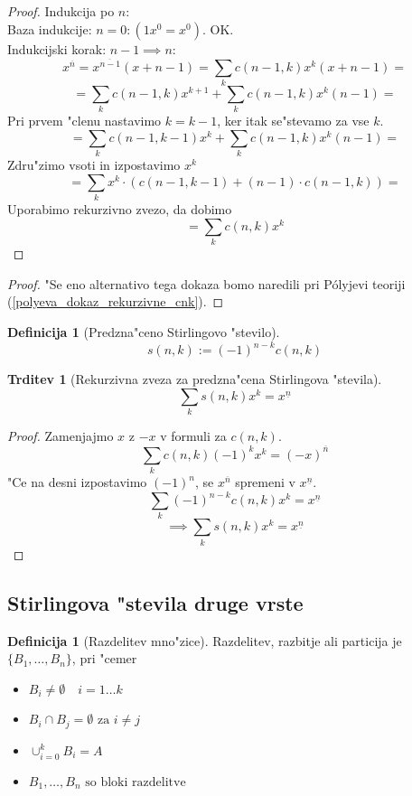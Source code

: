 \documentclass[a4paper,12pt]{article}
\theoremstyle{definition}
\newtheorem{defn}[counter]{Definicija}
\newtheorem{claim}[counter]{Trditev}
\theoremstyle{remark}
\begin{document}
\begin{proof}
    Indukcija po $n$:\\
    Baza indukcije: $n = 0: (1x^0 = x^0)$. OK.\\
    Indukcijski korak: $n - 1 \implies n$:\\
    \[x^{\overline{n}} = x^{\overline{n-1}}(x+n-1) = \sum_k c(n-1,k)x^k (x+n-1) =\]
    \[= \sum_k c(n-1,k)x^{k+1} + \sum_k c(n-1,k)x^k (n-1) = \]
    Pri prvem "clenu nastavimo $k = k-1$, ker itak se"stevamo za vse $k$.
    \[= \sum_k c(n-1,k-1)x^{k} + \sum_k c(n-1,k)x^k (n-1) = \]
    Zdru"zimo vsoti in izpostavimo $x^k$
    \[= \sum_k x^{k}\cdot (c(n-1,k-1) + (n-1)\cdot c(n-1,k)) = \]
    Uporabimo rekurzivno zvezo, da dobimo
    \[= \sum_k c(n,k)x^k\]
\end{proof}
\begin{proof}
	"Se eno alternativo tega dokaza bomo naredili pri P\'olyjevi teoriji (\ref{polyeva_dokaz_rekurzivne_cnk}).
\end{proof}

\begin{defn}[Predzna"ceno Stirlingovo "stevilo]
	\[s(n,k) := (-1)^{n-k} c(n,k)\]
\end{defn}
\begin{claim}[Rekurzivna zveza za predzna"cena Stirlingova "stevila]
	\[\sum_k s(n,k) x^k = x^{\underline{n}}\]
\end{claim}
\begin{proof}
	Zamenjajmo $x$ z $-x$ v formuli za $c(n,k)$.
	\[\sum_k c(n,k) (-1)^k x^k = (-x)^{\overline{n}}\]
	"Ce na desni izpostavimo $(-1)^{n}$, se $x^{\overline{n}}$ spremeni v $x^{\underline{n}}$.
	\[\sum_k (-1)^{n-k} c(n,k) x^k = x^{\underline{n}}\]
	\[\implies \sum_k s(n,k) x^k = x^{\underline{n}}\]
\end{proof}

\subsection{Stirlingova "stevila druge vrste}
\begin{defn}[Razdelitev mno"zice]
    Razdelitev, razbitje ali particija je $\{B_1, \ldots, B_n\}$, pri "cemer
    \begin{itemize}
        \item $B_i \neq \emptyset \quad i = 1 \ldots k$
        \item $B_i \cap B_j = \emptyset \text{ za } i \neq j$
        \item $\cup_{i=0}^k B_i = A$
        \item $B_1, \dots, B_n \text{ so bloki razdelitve}$
    \end{itemize}
\end{defn}
\end{document}
